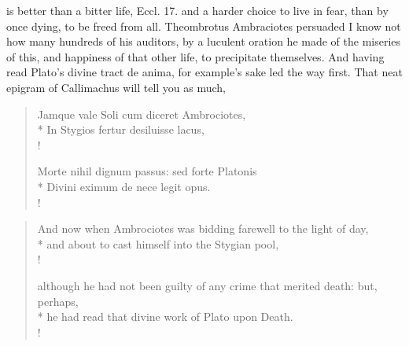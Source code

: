 is better than a bitter life, Eccl.  17. and a harder choice
to live in fear, than by once dying, to be freed from all. Theombrotus
Ambraciotes persuaded I know not how many hundreds of his auditors, by
a luculent oration he made of the miseries of this, and happiness of
that other life, to precipitate themselves. And having read Plato's
divine \textlatin{tract de anima}, for example's sake led the way first. That neat
epigram of Callimachus will tell you as much,
%
\begin{latin}
\begin{verse}%
Jamque vale Soli cum diceret Ambrociotes,\\*
In Stygios fertur desiluisse lacus,\\!

Morte nihil dignum passus: sed forte Platonis\\*
Divini eximum de nece legit opus.\\!
\end{verse}%
\end{latin}
\translationrule%
\begin{verse}%
And now when Ambrociotes was bidding farewell to the light of day,\\*
and about to cast himself into the Stygian pool,\\!

although he had not been guilty of any crime that merited death: but, perhaps,\\*
he had read that divine work of Plato upon Death.\\!
\end{verse}%
%

